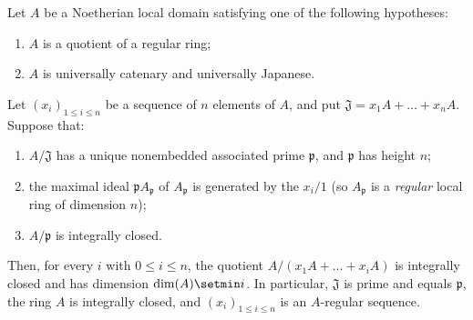 \begin{corollary}[5.12.10]
\label{IV.5.12.10}
Let $A$ be a Noetherian local domain satisfying one of the
following hypotheses:
\begin{enumerate}[{\rm a)}]
  \item $A$ is a quotient of a regular ring;
  \item $A$ is universally catenary and universally Japanese.
\end{enumerate}
Let $(x_i)_{1\leq i\leq n}$ be a sequence of $n$ elements of
$A$, and put $\mathfrak J=x_1A+\ldots+x_nA$.
Suppose that:
\begin{enumerate}[{\rm(i)}]
  \item $A/\mathfrak J$ has a unique nonembedded associated
  prime $\mathfrak p$, and $\mathfrak p$ has height $n$;
  \item the maximal ideal $\mathfrak pA_{\mathfrak p}$ of $A_{\mathfrak p}$
  is generated by the $x_i/1$ \textup{(so $A_{\mathfrak p}$ is a
  \emph{regular} local ring of dimension $n$)};
  \item $A/\mathfrak p$ is integrally closed.
\end{enumerate}
Then, for every $i$ with $0\leq i\leq n$, the quotient $A/(x_1A+\ldots+x_iA)$
is integrally closed and has dimension $\dim(A)\setmin i$.  In
particular, $\mathfrak J$ is prime and equals $\mathfrak p$, the
ring $A$ is integrally closed, and $(x_i)_{1\leq i\leq n}$ is an
$A$-regular sequence.
\end{corollary}

